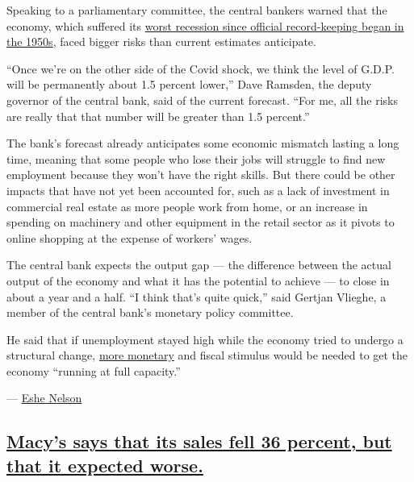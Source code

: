 Speaking to a parliamentary committee, the central bankers warned that
the economy, which suffered its
\href{https://www.nytimes3xbfgragh.onion/2020/08/12/business/britain-economy-recession-coronavirus.html}{worst
recession since official record-keeping began in the 1950s}, faced
bigger risks than current estimates anticipate.

``Once we're on the other side of the Covid shock, we think the level of
G.D.P. will be permanently about 1.5 percent lower,'' Dave Ramsden, the
deputy governor of the central bank, said of the current forecast. ``For
me, all the risks are really that that number will be greater than 1.5
percent.''

The bank's forecast already anticipates some economic mismatch lasting a
long time, meaning that some people who lose their jobs will struggle to
find new employment because they won't have the right skills. But there
could be other impacts that have not yet been accounted for, such as a
lack of investment in commercial real estate as more people work from
home, or an increase in spending on machinery and other equipment in the
retail sector as it pivots to online shopping at the expense of workers'
wages.

The central bank expects the output gap --- the difference between the
actual output of the economy and what it has the potential to achieve
--- to close in about a year and a half. ``I think that's quite quick,''
said Gertjan Vlieghe, a member of the central bank's monetary policy
committee.

He said that if unemployment stayed high while the economy tried to
undergo a structural change,
\href{https://www.nytimes3xbfgragh.onion/live/2020/08/28/business/stock-market-today-coronavirus\#bank-of-england-chief-says-negative-rates-are-possible-in-the-uk}{more
monetary} and fiscal stimulus would be needed to get the economy
``running at full capacity.''

--- \href{https://www.nytimes3xbfgragh.onion/by/eshe-nelson}{Eshe
Nelson}

\hypertarget{macys-says-that-its-sales-fell-36-percent-but-that-it-expected-worse}{%
\subsection{\texorpdfstring{\protect\hyperlink{macys-says-that-its-sales-fell-36-percent-but-that-it-expected-worse}{Macy's
says that its sales fell 36 percent, but that it expected
worse.}}{Macy's says that its sales fell 36 percent, but that it expected worse.}}\label{macys-says-that-its-sales-fell-36-percent-but-that-it-expected-worse}}

